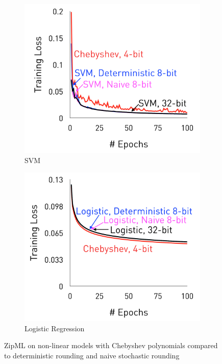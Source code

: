 \documentclass{article}
\begin{document}
\begin{figure}[h]
\centering
    \begin{subfigure}[h]{.4\columnwidth}
    \includegraphics[width=\columnwidth]{final-experiments/Naive-SVM} 
    \caption{SVM}
    \end{subfigure}
    \begin{subfigure}[h]{.4\columnwidth}
    \includegraphics[width=\columnwidth]{final-experiments/Naive-LR} 
    \caption{Logistic Regression}
    \end{subfigure}
\caption{ZipML on non-linear models with Chebyshev polynomials compared to deterministic rounding and naive stochastic rounding}
\label{fig:vsnaive}
\end{figure}
\end{document}
